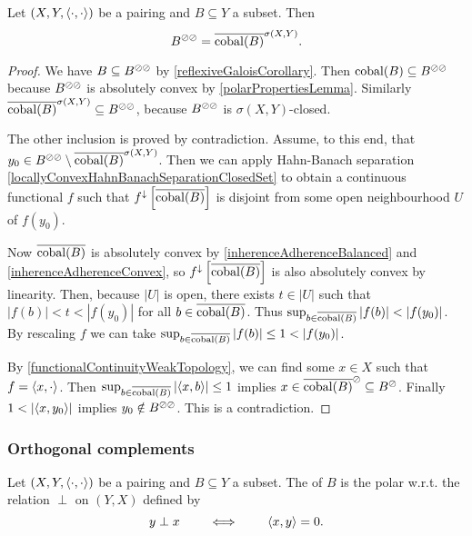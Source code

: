 \begin{proposition}
Let $\left( X,Y,\left\langle \cdot,\cdot \right\rangle \right)$ be a pairing and $B\subseteq Y$ a subset. Then
\[ B^{\oslash\oslash} = \overline{\operatorname{cobal}(B)}^{\sigma(X,Y)}. \]
\end{proposition}
\begin{proof}
We have $B\subseteq B^{\oslash\oslash}$ by \ref{reflexiveGaloisCorollary}. Then $\operatorname{cobal}(B) \subseteq B^{\oslash\oslash}$ because $B^{\oslash\oslash}$ is absolutely convex by \ref{polarPropertiesLemma}. Similarly $\overline{\operatorname{cobal}(B)}^{\sigma(X,Y)} \subseteq B^{\oslash\oslash}$, because $B^{\oslash\oslash}$ is $\sigma(X,Y)$-closed.

The other inclusion is proved by contradiction. Assume, to this end, that $y_0\in B^{\oslash\oslash} \setminus \overline{\operatorname{cobal}(B)}^{\sigma(X,Y)}$. Then we can apply Hahn-Banach separation \ref{locallyConvexHahnBanachSeparationClosedSet} to obtain a continuous functional $f$ such that $f^\downarrow\left[\overline{\operatorname{cobal}(B)}\right]$ is disjoint from some open neighbourhood $U$ of $f(y_0)$.

Now $\overline{\operatorname{cobal}(B)}$ is absolutely convex by \ref{inherenceAdherenceBalanced} and \ref{inherenceAdherenceConvex}, so $f^\downarrow\left[\overline{\operatorname{cobal}(B)}\right]$ is also absolutely convex by linearity. Then, because $|U|$ is open, there exists $t\in |U|$ such that $|f(b)| < t < |f(y_0)|$ for all $b\in \overline{\operatorname{cobal}(B)}$. Thus $\sup_{b\in \overline{\operatorname{cobal}(B)}}|f(b)| < |f(y_0)|$. By rescaling $f$ we can take $\sup_{b\in \overline{\operatorname{cobal}(B)}}|f(b)| \leq 1 < |f(y_0)|$.

By \ref{functionalContinuityWeakTopology}, we can find some $x\in X$ such that $f = \left\langle x,\cdot \right\rangle$. Then $\sup_{b\in \overline{\operatorname{cobal}(B)}}\left|\left\langle x, b \right\rangle\right| \leq 1$ implies $x\in \overline{\operatorname{cobal}(B)}^\oslash \subseteq B^\oslash$. Finally $1 < \left|\left\langle x, y_0 \right\rangle\right|$ implies $y_0\notin B^{\oslash\oslash}$. This is a contradiction.
\end{proof}

\subsubsection{Orthogonal complements}
\begin{definition}
Let $\left( X,Y,\left\langle \cdot,\cdot \right\rangle \right)$ be a pairing and $B\subseteq Y$ a subset. The  of $B$ is the polar w.r.t. the relation $\perp$ on $(Y,X)$ defined by
\[ y\perp x \qquad\iff\qquad \left\langle x, y \right\rangle = 0. \]
\end{definition}


